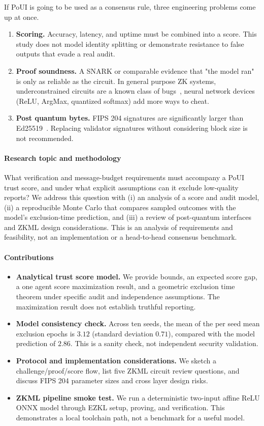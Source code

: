 \documentclass[conference]{IEEEtran}
\begin{document}
If PoUI is going to be used as a consensus rule, three engineering problems come up at once.

\begin{enumerate}
  \item \textbf{Scoring.} Accuracy, latency, and uptime must be combined into a score. This study does not model identity splitting or demonstrate resistance to false outputs that evade a real audit.
  \item \textbf{Proof soundness.} A SNARK or comparable evidence that "the model ran" is only as reliable as the circuit. In general purpose ZK systems, underconstrained circuits are a known class of bugs~\cite{pailoor2023pldi}, neural network devices (ReLU, ArgMax, quantized softmax) add more ways to cheat.
  \item \textbf{Post quantum bytes.} FIPS 204 signatures are significantly larger than Ed25519~\cite{nistfips204,rfc8032}. Replacing validator signatures without considering block size is not recommended.
\end{enumerate}

\paragraph{Research topic and methodology}
What verification and message-budget requirements must accompany a PoUI trust score, and under what explicit assumptions can it exclude low-quality reports? We address this question with (i) an analysis of a score and audit model, (ii) a reproducible Monte Carlo that compares sampled outcomes with the model's exclusion-time prediction, and (iii) a review of post-quantum interfaces and ZKML design considerations. This is an analysis of requirements and feasibility, not an implementation or a head-to-head consensus benchmark.

\paragraph{Contributions}
\begin{itemize}
  \item \textbf{Analytical trust score model.} We provide bounds, an expected score gap, a one agent score maximization result, and a geometric exclusion time theorem under specific audit and independence assumptions. The maximization result does not establish truthful reporting.
  \item \textbf{Model consistency check.} Across ten seeds, the mean of the per seed mean exclusion epochs is $3.12$ (standard deviation $0.71$), compared with the model prediction of $2.86$. This is a sanity check, not independent security validation.
 \item \textbf{Protocol and implementation considerations.} We sketch a challenge/proof/score flow, list five ZKML circuit review questions, and discuss FIPS 204 parameter sizes and cross layer design risks.
  \item \textbf{ZKML pipeline smoke test.} We run a deterministic two-input affine ReLU ONNX model through EZKL setup, proving, and verification. This demonstrates a local toolchain path, not a benchmark for a useful model.
\end{itemize}
\end{document}
